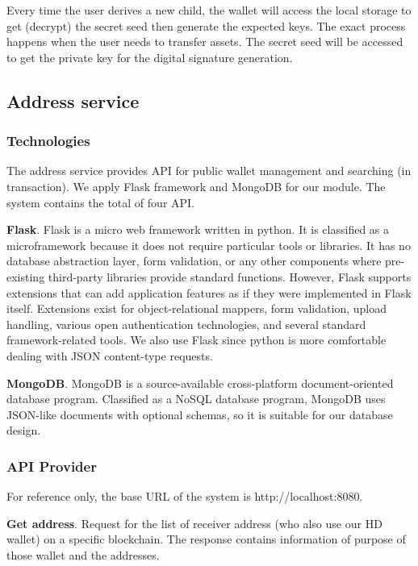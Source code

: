 Every time the user derives a new child, the wallet will access the local storage to get (decrypt) the secret seed then generate the expected keys. The exact process happens when the user needs to transfer assets. The secret seed will be accessed to get the private key for the digital signature generation.


\subsection{Address service}

\label{address}
\subsubsection{Technologies}

The address service provides API for public wallet management and searching (in transaction). We apply Flask framework and MongoDB for our module. The system contains the total of four API.

\bigskip
{\textbf{Flask}}. Flask \cite{grinberg2018flask} is a micro web framework written in python. It is classified as a microframework because it does not require particular tools or libraries. It has no database abstraction layer, form validation, or any other components where pre-existing third-party libraries provide standard functions. However, Flask supports extensions that can add application features as if they were implemented in Flask itself. Extensions exist for object-relational mappers, form validation, upload handling, various open authentication technologies, and several standard framework-related tools. We also use Flask since python is more comfortable dealing with JSON content-type requests.


\bigskip
{\textbf{MongoDB}}. MongoDB \cite{mongo} is a source-available cross-platform document-oriented database program. Classified as a NoSQL database program, MongoDB uses JSON-like documents with optional schemas, so it is suitable for our database design.

\bigskip
\subsubsection{API Provider}

For reference only, the base URL of the system is http://localhost:8080.

{\textbf{Get address}}. Request for the list of receiver address (who also use our HD wallet) on a specific blockchain. The response contains information of purpose of those wallet and the addresses.


